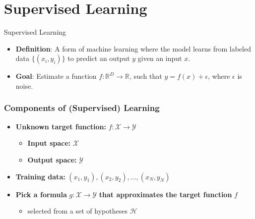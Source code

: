 \documentclass[serif, aspectratio=169]{beamer}
\begin{document}
\section{Supervised Learning }

\begin{frame}{Supervised Learning}
    \begin{itemize}
        \item \textbf{Definition}: A form of machine learning where the model learns from labeled data \( \{(x_i, y_i)\} \) to predict an output \( y \) given an input \( x \).
        \item \textbf{Goal}: Estimate a function \( f: \mathbb{R}^D \rightarrow \mathbb{R} \), such that \( y = f(x) + \epsilon \), where \( \epsilon \) is noise.
    \end{itemize}
\end{frame}

\begin{frame}
    \frametitle{Components of (Supervised) Learning}

    \begin{itemize}
        \item \textbf{Unknown target function:} \( f : \mathcal{X} \to \mathcal{Y} \)
        \begin{itemize}
            \item \textbf{Input space:} \( \mathcal{X} \)
            \item \textbf{Output space:} \( \mathcal{Y} \)
        \end{itemize}
        
        \vspace{0.5cm} %
        
        \item \textbf{Training data:} \( (x_1, y_1), (x_2, y_2), \ldots, (x_N, y_N) \)
        
        \vspace{0.5cm}
        
        \item \textbf{Pick a formula} \( g : \mathcal{X} \to \mathcal{Y} \) \textbf{that approximates the target function} \( f \)
        \begin{itemize}
            \item selected from a set of hypotheses \( \mathcal{H} \)
        \end{itemize}
    \end{itemize}
    
\end{frame}
\end{document}
